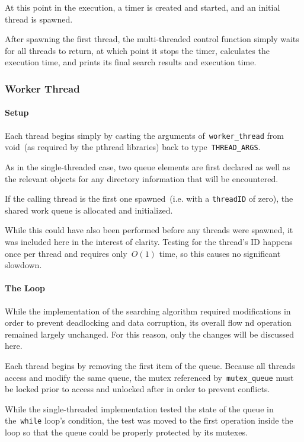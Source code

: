 \documentclass{article}
\newcommand{\clst}[2]{
	\begin{center}
	\parbox{.6\textwidth}{
	}
	\end{center}
}
\newcommand{\chompclst}[2]{
	\begin{center}
	\parbox{.6\textwidth}{
	}
	\end{center}
}
\newcommand{\ttt}[1]{\texttt{#1}}
\begin{document}
At this point in the execution, a timer is created and started, and an initial
thread is spawned.
%
\clst{228}{237}
%
After spawning the first thread, the multi-threaded control function simply
waits for all threads to return, at which point it stops the timer, calculates
the execution time, and prints its final search results and execution time.
%
\clst{239}{259}

\subsubsection{Worker Thread}
\paragraph{Setup}
Each thread begins simply by casting the arguments of~\ttt{worker\_thread} from
void~(as required by the pthread libraries) back to type~\ttt{THREAD\_ARGS}.
%
\chompclst{1}{9}
%
As in the single-threaded case, two queue elements are first declared as well
as the relevant objects for any directory information that will be encountered.

If the calling thread is the first one spawned~(i.e. with a \ttt{threadID} of
zero), the shared work queue is allocated and initialized.
%
\chompclst{12}{27}
%
While this could have also been performed before any threads were spawned, it
was included here in the interest of clarity.  Testing for the thread's ID
happens once per thread and requires only~$O(1)$ time, so this causes no
significant slowdown.

\paragraph{The Loop}
While the implementation of the searching algorithm required modifications in
order to prevent deadlocking and data corruption, its overall flow nd operation
remained largely unchanged.  For this reason, only the changes will be
discussed here.

Each thread begins by removing the first item of the queue.  Because all threads access
and modify the same queue, the mutex referenced by~\ttt{mutex\_queue} must be
locked prior to access and unlocked after in order to prevent conflicts.
%
\chompclst{30}{37}
%
While the single-threaded implementation tested the state of the queue in
the~\ttt{while} loop's condition, the test was moved to the first operation
inside the loop so that the queue could be properly protected by its mutexes.
\end{document}
